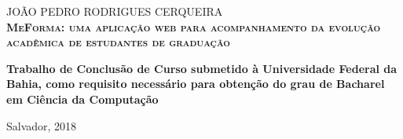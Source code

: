 
\begin{center}

    {\large JOÃO PEDRO RODRIGUES CERQUEIRA\\}
    \vspace{8cm}
    {\Large \textsc\textbf{{MeForma: uma aplicação web para acompanhamento da evolução acadêmica de estudantes de graduação} }\\}
    \vspace{1cm}
    \hspace{.45\linewidth}
    \begin{minipage}{.50\linewidth}

            \textbf{Trabalho de Conclusão de Curso submetido à Universidade Federal da Bahia,  como requisito 
            necessário para obtenção do grau de Bacharel em Ciência da Computação }

           
    
    \end{minipage}

    \vspace{2cm}
    \vfill
    {\large Salvador, 2018}
\end{center}

